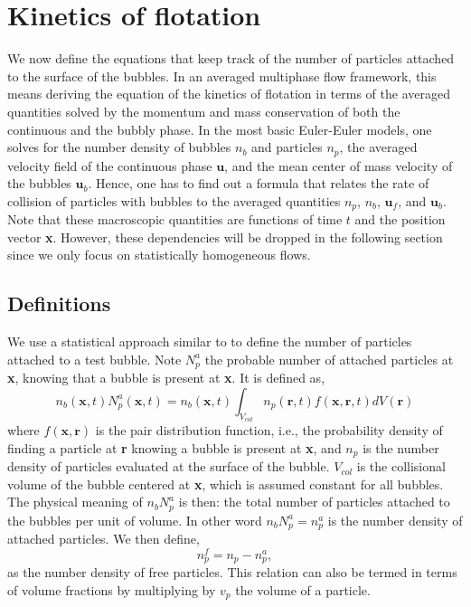 \section{Kinetics of flotation}
\label{sec:efficiency}
We now define the equations that keep track of the number of particles attached to the surface of the bubbles.
In an averaged multiphase flow framework, this means deriving the equation of the kinetics of flotation in terms of the averaged quantities solved by the momentum and mass conservation of both the continuous and the bubbly phase.
In the most basic Euler-Euler models, one solves for the number density of bubbles $n_b$ and particles $n_p$, the averaged velocity field of the continuous phase $\textbf{u}$, and the mean center of mass velocity of the bubbles $\textbf{u}_b$.
Hence,  one has to find out a formula that relates the rate of collision of particles with bubbles to the averaged quantities $n_p$, $n_b$, $\textbf{u}_f$, and $\textbf{u}_b$. 
Note that these macroscopic quantities are functions of time $t$ and the position vector \textbf{x}.
However, these dependencies will be dropped in the following section since we only focus on statistically homogeneous flows.

\subsection{Definitions}

We use a statistical approach similar to \citet{roure2021modelling} to define the number of particles attached to a test bubble.
Note $N_p^a$ the probable number of attached particles at \textbf{x}, knowing that a bubble is present at \textbf{x}.
It is defined as,
\begin{equation}
    n_b(\textbf{x},t) N_p^a(\textbf{x},t) = n_b(\textbf{x},t)\int_{V_{col}} n_p(\textbf{r},t) f(\textbf{x},\textbf{r},t) dV(\textbf{r})
    \label{eq:Npa}
\end{equation}
where $f(\textbf{x},\textbf{r})$ is the pair distribution function, i.e., the probability density of finding a particle at \textbf{r} knowing a bubble is present at \textbf{x}, and $n_p$ is the number density of particles evaluated at the surface of the bubble. 
$V_{col}$ is the collisional volume of the bubble centered at \textbf{x}, which is assumed constant for all bubbles. 
The physical meaning of $n_b N_p^a$ is then: the total number of particles attached to the bubbles per unit of volume. 
In other word $n_bN_p^a = n_p^a$ is the number density of attached particles. 
We then define, 
\begin{equation}
    n_p^f= n_p - n_p^a,
\end{equation}
as the number density of free particles. 
This relation can also be termed in terms of volume fractions by multiplying  by $v_p$ the volume of a particle. 

